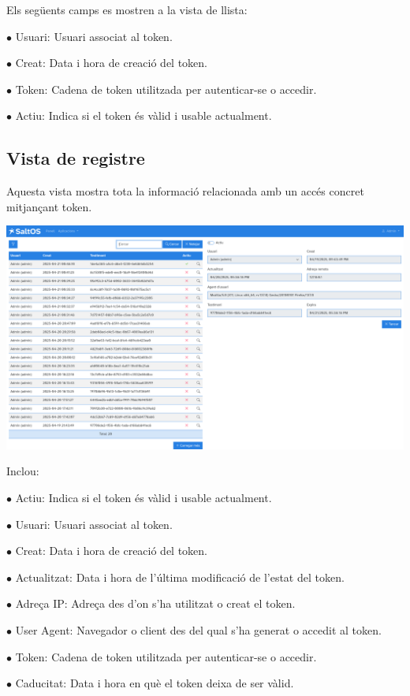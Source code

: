 \documentclass[a4paper]{article}
\begin{document}
Els següents camps es mostren a la vista de llista:

\begin{compactitem}
\item[\color{myblue}$\bullet$] Usuari: Usuari associat al token.
\item[\color{myblue}$\bullet$] Creat: Data i hora de creació del token.
\item[\color{myblue}$\bullet$] Token: Cadena de token utilitzada per autenticar-se o accedir.
\item[\color{myblue}$\bullet$] Actiu: Indica si el token és vàlid i usable actualment.
\end{compactitem}

\hypertarget{toc29}{}
\subsection{Vista de registre}

Aquesta vista mostra tota la informació relacionada amb un accés concret mitjançant token.

\begin{center}\includegraphics[width=1\textwidth]{../ujest/snaps/test-screenshots-js-screenshots-common-tokenslog-view-1-ca-es-1-snap.png}\end{center}

Inclou:

\begin{compactitem}
\item[\color{myblue}$\bullet$] Actiu: Indica si el token és vàlid i usable actualment.
\item[\color{myblue}$\bullet$] Usuari: Usuari associat al token.
\item[\color{myblue}$\bullet$] Creat: Data i hora de creació del token.
\item[\color{myblue}$\bullet$] Actualitzat: Data i hora de l'última modificació de l'estat del token.
\item[\color{myblue}$\bullet$] Adreça IP: Adreça des d'on s'ha utilitzat o creat el token.
\item[\color{myblue}$\bullet$] User Agent: Navegador o client des del qual s'ha generat o accedit al token.
\item[\color{myblue}$\bullet$] Token: Cadena de token utilitzada per autenticar-se o accedir.
\item[\color{myblue}$\bullet$] Caducitat: Data i hora en què el token deixa de ser vàlid.
\end{compactitem}
\end{document}
